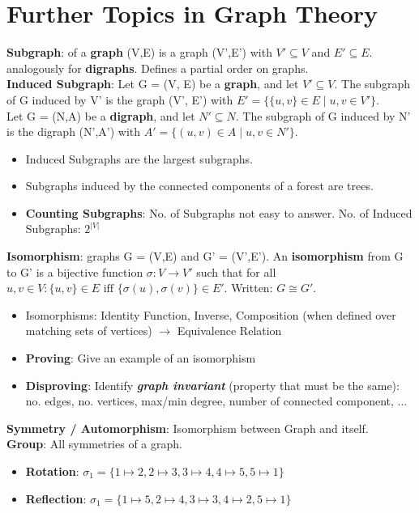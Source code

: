 \section*{Further Topics in Graph Theory}
\textbf{Subgraph}: of a \textbf{graph} (V,E) is a graph (V',E') with $V' \subseteq V$ and $E' \subseteq E$. analogously for \textbf{digraphs}. Defines a partial order on graphs. \\
\textbf{Induced Subgraph}: Let G = (V, E) be a \textbf{graph}, and let $V' \subseteq V$. The subgraph of G induced by V' is the graph (V', E') with $E' = \{\{u, v\} \in E \mid u,v \in V'\}$. \\
Let G = (N,A) be a \textbf{digraph}, and let $N' \subseteq N$. The subgraph of G induced by N' is the digraph (N',A') with $A' = \{(u,v) \in A \mid u,v \in N'\}$. \\
\begin{itemize}[noitemsep,topsep=0pt,leftmargin=*]
    \item Induced Subgraphs are the largest subgraphs.
    \item Subgraphs induced by the connected components of a forest are trees.
    \item \textbf{Counting Subgraphs}: No. of Subgraphs not easy to answer. No. of Induced Subgraphs: $2^{|V|}$\\
\end{itemize}
\textbf{Isomorphism}: graphs G = (V,E) and G' = (V',E'). An \textbf{isomorphism} from G to G' is a bijective function $\sigma: V \rightarrow V'$ such that for all $u, v \in V: \{u,v\} \in E \text{ iff } \{\sigma(u), \sigma(v)\} \in E'$. Written: $G \cong G'$. 
\begin{itemize}[noitemsep,topsep=0pt,leftmargin=*]
    \item Isomorphisms: Identity Function, Inverse, Composition (when defined over matching sets of vertices)    $\rightarrow$ Equivalence Relation 
    \item \textbf{Proving}: Give an example of an isomorphism 
    \item \textbf{Disproving}: Identify \textbf{\textit{graph invariant}} (property that must be the same): no. edges, no. vertices, max/min degree, number of connected component, ...  
\end{itemize}
\textbf{Symmetry / Automorphism}: Isomorphism between Graph and itself. \\
\textbf{Group}: All symmetries of a graph. \\   
\begin{itemize}[noitemsep,topsep=0pt,leftmargin=*]
    \item \textbf{Rotation}: $\sigma_1 =\{1 \mapsto 2, 2 \mapsto 3, 3 \mapsto 4, 4 \mapsto 5, 5 \mapsto 1\}$
    \item \textbf{Reflection}: $\sigma_1 =\{1 \mapsto 5, 2 \mapsto 4, 3 \mapsto 3, 4 \mapsto 2, 5 \mapsto 1\}$
\end{itemize} 
